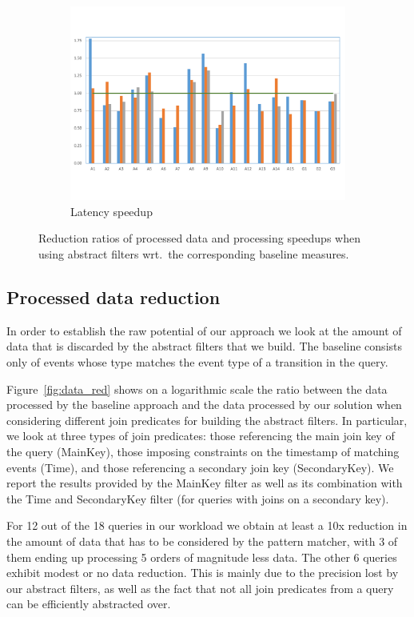 \begin{figure}[t!]
\begin{subfigure}{\columnwidth}
\includegraphics[clip, trim=0.3cm 2cm 0.4cm 1.8cm,
width=\columnwidth]{graphs_latency_red.pdf}
\caption{Latency speedup}
\label{fig:latency_red}
\end{subfigure}

\caption{Reduction ratios of processed data and processing speedups when using
abstract filters wrt.\ the corresponding baseline measures.}
\end{figure}


\subsection{Processed data reduction}

In order to establish the raw potential of our approach we look at the amount of
data that is discarded by the abstract filters that we build.
The baseline consists only of events whose type matches the event
type of a transition in the query.

Figure~\ref{fig:data_red} shows on a logarithmic scale the ratio between the
data processed by the baseline approach and the data processed by our solution
when considering different join predicates for building the abstract filters.
In particular, we look at three types of join predicates: those referencing
the main join key of the query (MainKey), those imposing constraints on the
timestamp of matching events (Time), and those referencing a secondary join key
(SecondaryKey).
We report the results provided by the MainKey filter as well as its combination
with the Time and SecondaryKey filter (for queries with joins on a secondary
key).
 
For 12 out of the 18 queries in our workload we obtain at least a 10x reduction
in the amount of data that has to be considered by the pattern matcher, with 3
of them ending up processing 5 orders of magnitude less data.
The other 6 queries exhibit modest or no data reduction. This is mainly due to
the precision lost by our abstract filters, as well as the fact that not all
join predicates from a query can be efficiently abstracted over. 

